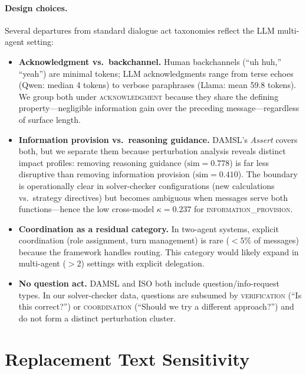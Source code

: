 \paragraph{Design choices.} Several departures from standard dialogue act taxonomies reflect the LLM multi-agent setting:

\begin{sloppypar}
\begin{itemize}[nosep, leftmargin=*]
    \item \textbf{Acknowledgment vs.\ backchannel.} Human backchannels (``uh huh,'' ``yeah'') are minimal tokens; LLM acknowledgments range from terse echoes (Qwen: median 4 tokens) to verbose paraphrases (Llama: mean 59.8 tokens). We group both under \textsc{acknowledgment} because they share the defining property---negligible information gain over the preceding message---regardless of surface length.
    \item \textbf{Information provision vs.\ reasoning guidance.} DAMSL's \textit{Assert} covers both, but we separate them because perturbation analysis reveals distinct impact profiles: removing reasoning guidance ($\text{sim} = 0.778$) is far less disruptive than removing information provision ($\text{sim} = 0.410$). The boundary is operationally clear in solver-checker configurations (new calculations vs.\ strategy directives) but becomes ambiguous when messages serve both functions---hence the low cross-model $\kappa = 0.237$ for \textsc{information\_provision}.
    \item \textbf{Coordination as a residual category.} In two-agent systems, explicit coordination (role assignment, turn management) is rare ($< 5\%$ of messages) because the framework handles routing. This category would likely expand in multi-agent ($>$2) settings with explicit delegation.
    \item \textbf{No question act.} DAMSL and ISO both include question/info-request types. In our solver-checker data, questions are subsumed by \textsc{verification} (``Is this correct?'') or \textsc{coordination} (``Should we try a different approach?'') and do not form a distinct perturbation cluster.
\end{itemize}
\end{sloppypar}

\section{Replacement Text Sensitivity}
\label{app:replacement-sensitivity}

